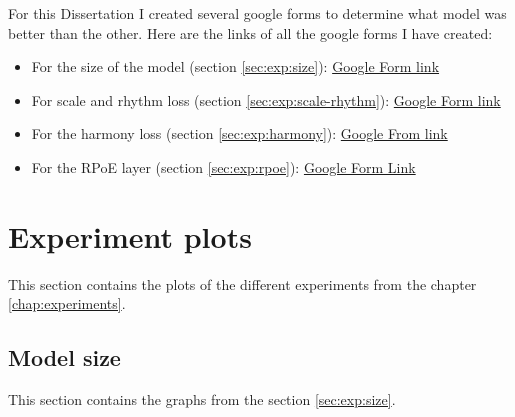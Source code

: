\documentclass[12pt]{report}
\begin{document}

For this Dissertation I created several google forms to determine what model was better than the other.
Here are the links of all the google forms I have created:
\begin{itemize}
    \item For the size of the model (section \ref{sec:exp:size}):  \href{https://forms.gle/BdEcYZgYWXPigSdA6}{Google Form link}
    \item For scale and rhythm loss (section \ref{sec:exp:scale-rhythm}): \href{https://docs.google.com/forms/d/e/1FAIpQLSckCvIg1mZdXlh1fSv_yG68dEbfQRN-WwkGG2KVdcjQ4rQgbw/viewform?usp=sf_link}{Google Form link}
    \item For the harmony loss (section \ref{sec:exp:harmony}): \href{https://docs.google.com/forms/d/e/1FAIpQLScZ1ZAkCxwIRiuewNlDUFgZcpEY2O-Yg0T8IEQzp4k9_BCCJg/viewform?usp=sf_link}{Google From link}
    \item For the RPoE layer (section \ref{sec:exp:rpoe}): \href{https://docs.google.com/forms/d/e/1FAIpQLSf1tkCLj78u-IoMYjGWa3iTYWIT_gbPnGIShjFox4whfhkjLw/viewform?usp=sf_link}{Google Form Link}
\end{itemize}

\section{Experiment plots}
\label{appendix:exp}

This section contains the plots of the different experiments from the chapter \ref{chap:experiments}.

\subsection{Model size}
\label{appendix:size}

This section contains the graphs from the section \ref{sec:exp:size}.
\end{document}
